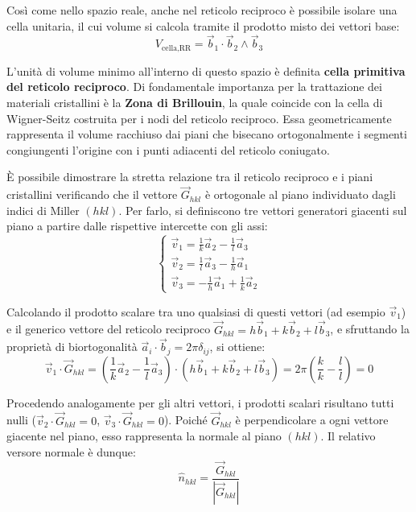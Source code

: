 Così come nello spazio reale, anche nel reticolo reciproco è possibile isolare una cella unitaria, il cui volume si calcola tramite il prodotto misto dei vettori base:
\begin{equation}
    V_{\text{cella,RR}} = \vec{b}_1 \cdot \vec{b}_2 \wedge \vec{b}_3
\end{equation}

L'unità di volume minimo all'interno di questo spazio è definita \textbf{cella primitiva del reticolo reciproco}. Di fondamentale importanza per la trattazione dei materiali cristallini è la \textbf{Zona di Brillouin}, la quale coincide con la cella di Wigner-Seitz costruita per i nodi del reticolo reciproco. Essa geometricamente rappresenta il volume racchiuso dai piani che bisecano ortogonalmente i segmenti congiungenti l'origine con i punti adiacenti del reticolo coniugato.


È possibile dimostrare la stretta relazione tra il reticolo reciproco e i piani cristallini verificando che il vettore \( \vec{G}_{hkl} \) è ortogonale al piano individuato dagli indici di Miller \( (hkl) \). Per farlo, si definiscono tre vettori generatori giacenti sul piano a partire dalle rispettive intercette con gli assi:
\begin{equation}
\begin{cases}
    \vec{v}_1 = \frac{1}{k}\vec{a}_2 - \frac{1}{l}\vec{a}_3 \\
    \vec{v}_2 = \frac{1}{l}\vec{a}_3 - \frac{1}{h}\vec{a}_1 \\
    \vec{v}_3 = -\frac{1}{h}\vec{a}_1 + \frac{1}{k}\vec{a}_2
\end{cases}
\end{equation}

Calcolando il prodotto scalare tra uno qualsiasi di questi vettori (ad esempio \( \vec{v}_1 \)) e il generico vettore del reticolo reciproco \( \vec{G}_{hkl} = h\vec{b}_1 + k\vec{b}_2 + l\vec{b}_3 \), e sfruttando la proprietà di biortogonalità \( \vec{a}_i \cdot \vec{b}_j = 2\pi\delta_{ij} \), si ottiene:
\begin{equation}
    \vec{v}_1 \cdot \vec{G}_{hkl} = \left( \frac{1}{k}\vec{a}_2 - \frac{1}{l}\vec{a}_3 \right) \cdot (h\vec{b}_1 + k\vec{b}_2 + l\vec{b}_3) = 2\pi \left( \frac{k}{k} - \frac{l}{l} \right) = 0
\end{equation}

Procedendo analogamente per gli altri vettori, i prodotti scalari risultano tutti nulli (\( \vec{v}_2 \cdot \vec{G}_{hkl} = 0 \), \( \vec{v}_3 \cdot \vec{G}_{hkl} = 0 \)). Poiché \( \vec{G}_{hkl} \) è perpendicolare a ogni vettore giacente nel piano, esso rappresenta la normale al piano \( (hkl) \). Il relativo versore normale è dunque:
\begin{equation}
    \hat{n}_{hkl} = \frac{\vec{G}_{hkl}}{|\vec{G}_{hkl}|}
\end{equation}

